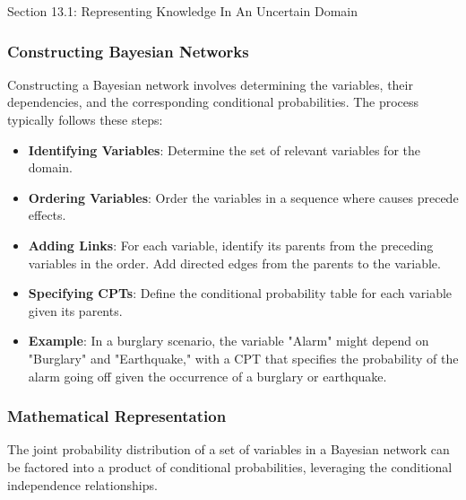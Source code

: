 \begin{notes}{Section 13.1: Representing Knowledge In An Uncertain Domain}
\begin{highlight}
    \end{highlight}
    
    \subsubsection*{Constructing Bayesian Networks}
    
    Constructing a Bayesian network involves determining the variables, their dependencies, and the corresponding conditional probabilities. The process typically follows these steps:
    
    \begin{highlight}
    
        \begin{itemize}
            \item \textbf{Identifying Variables}: Determine the set of relevant variables for the domain.
            \item \textbf{Ordering Variables}: Order the variables in a sequence where causes precede effects.
            \item \textbf{Adding Links}: For each variable, identify its parents from the preceding variables in the order. Add directed edges from the parents to the variable.
            \item \textbf{Specifying CPTs}: Define the conditional probability table for each variable given its parents.
            \item \textbf{Example}: In a burglary scenario, the variable "Alarm" might depend on "Burglary" and "Earthquake," with a CPT that specifies the probability of the alarm going off given the 
            occurrence of a burglary or earthquake.
        \end{itemize}
    
    \end{highlight}
    
    \subsubsection*{Mathematical Representation}
    
    The joint probability distribution of a set of variables in a Bayesian network can be factored into a product of conditional probabilities, leveraging the conditional independence relationships.
    
    \begin{highlight}
    

\end{highlight}
\end{notes}
